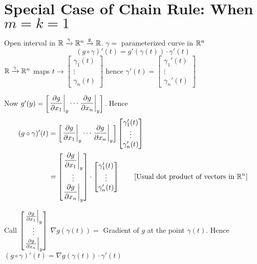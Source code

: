 \section{Special Case of Chain Rule: When \texorpdfstring{$m=k=1$}{m=k=1}}
Open interval in $\mathbb{R}\xrightarrow{\gamma}\mathbb{R}^n\xrightarrow{g}\mathbb{R}$. $\gamma=$ parameterized curve in $\mathbb{R}^n$
$$(g\circ \gamma)'(t)=g'(\gamma(t))\cdot \gamma'(t)$$ ${\mathbb{R}\xrightarrow{\gamma}\mathbb{R}^n}$ maps $t\to\begin{bmatrix}\gamma_1(t)\\ \vdots\\ \gamma_n(t)	\end{bmatrix}$ hence $\gamma'(t)=\begin{bmatrix}
		\gamma_1'(t) \\ \vdots\\ \gamma_n'(t)
	\end{bmatrix}$

Now $g'(y)=\begin{bmatrix}
		\left.\dfrac{\partial g}{\partial x_1}\right|_y\cdots \left.\dfrac{\partial g}{\partial x_n}\right|_y
	\end{bmatrix}$. Hence \begin{align*}
	(g\circ \gamma)'(t) & = \begin{bmatrix}
		                        \left.\dfrac{\partial g}{\partial x_1}\right|_y\cdots \left.\dfrac{\partial g}{\partial x_n}\right|_y
	                        \end{bmatrix}\begin{bmatrix}
		                                     \gamma_1'(t) \\ \vdots\\ \gamma_n'(t)
	                                     \end{bmatrix}                                  \\
	                    & = \begin{bmatrix}
		                        \left.\dfrac{\partial g}{\partial x_1}\right|_y \\ \vdots \\ \left.\dfrac{\partial g}{\partial x_n}\right|_y
	                        \end{bmatrix}\cdot \begin{bmatrix}
		                                           \gamma_1'(t) \\ \vdots\\ \gamma_n'(t)
	                                           \end{bmatrix}\qquad[\text{Usual dot product of vectors in }\mathbb{R}^n] \\
\end{align*}
\pagebreak

Call $\begin{bmatrix}
		\left.\frac{\partial g}{\partial x_1}\right|_y \\ \vdots \\ \left.\frac{\partial g}{\partial x_n}\right|_y
	\end{bmatrix}$ $\nabla g(\gamma(t))=$ Gradient of $g$ at the point $\gamma(t)$. Hence $(g\circ\gamma)'(t)=\nabla g(\gamma(t))\cdot\gamma'(t)$


